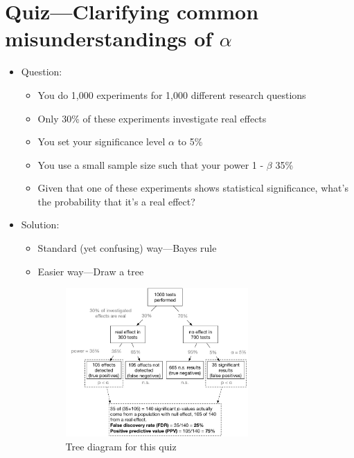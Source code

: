 \section{Quiz---Clarifying common misunderstandings of $\alpha$}
\begin{itemize}
    \item Question:
    \begin{itemize}
        \item You do 1,000 experiments for 1,000 different research questions
        \item Only 30\% of these experiments investigate real effects
        \item You set your significance level $\alpha$ to 5\%
        \item You use a small sample size such that your power 1 - $\beta$ 35\%
        \item Given that one of these experiments shows statistical significance, what's the probability that it's a real effect?
    \end{itemize}
    \item Solution:
    \begin{itemize}
        \item Standard (yet confusing) way---Bayes rule
        \item Easier way---Draw a tree\\
        \begin{figure}[ht!]
            \begin{center}
                \includegraphics[width=0.7\textwidth]{figures/PPV_tree.jpeg}
                \caption{
                Tree diagram for this quiz}
                \label{fig:tree_diagram}
            \end{center}
        \end{figure}
        \begin{itemize}

\end{itemize}
\end{itemize}
\end{itemize}
